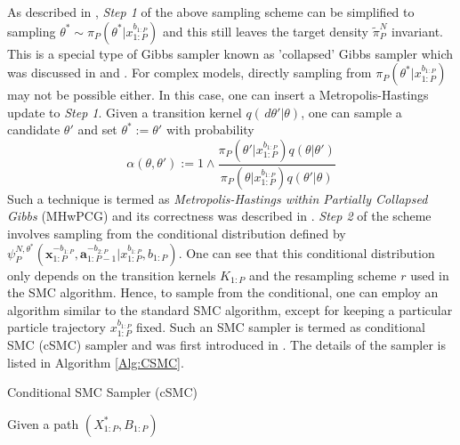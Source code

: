 \documentclass[12pt,a4paper]{article}
\begin{document}
As described in \cite{andrieu2010particle}, \textit{Step 1} of the above sampling scheme can be simplified to sampling $\theta^{*} \sim \pi_P(\theta^{*}|x_{1:P}^{b_{1:P}})$ and this still leaves the target density $\tilde{\pi}_P^N$ invariant. This is a special type of Gibbs sampler known as 'collapsed' Gibbs sampler which was discussed in \cite{liu2001monte} and \cite{van2008partially}. For complex models, directly sampling from \(\pi_P(\theta^{*}|x_{1:P}^{b_{1:P}})\) may not be possible either. In this case, one can insert a Metropolis-Hastings update to \textit{Step 1}. Given a transition kernel \(q(\,d\theta'|\theta)\), one can sample a candidate \(\theta'\) and set \(\theta^{*} := \theta'\) with probability 
\[
    \alpha(\theta,\theta') := 1 \wedge  \frac{\pi_P(\theta'|x_{1:P}^{b_{1:P}})q(\theta|\theta')}{\pi_P(\theta|x_{1:P}^{b_{1:P}})q(\theta'|\theta)} 
\]
Such a technique is termed as \textit{Metropolis-Hastings within Partially Collapsed Gibbs} (MHwPCG) and its correctness was described in \cite{van2008partially}. \textit{Step 2} of the scheme involves sampling from the conditional distribution defined by \(\psi_{P}^{N,\theta^{*}}\left(\mathbf{x}_{1:P}^{-b_{1:P}},\mathbf{a}_{1:P-1}^{-b_{2:P}}|x_{1:P}^{b_{1:P}},b_{1:P}\right)\). One can see that this conditional distribution only depends on the transition kernels $K_{1:P}$ and the resampling scheme $r$ used in the SMC algorithm. Hence, to sample from the conditional, one can employ an algorithm similar to the standard SMC algorithm, except for keeping a particular particle trajectory \(x_{1:P}^{b_{1:P}}\) fixed. Such an SMC sampler is termed as conditional SMC (cSMC) sampler and was first introduced in \cite{andrieu2010particle}. The details of the sampler is listed in Algorithm \ref{Alg:CSMC}.

\begin{algorithm}[htb!]
    \caption{Conditional SMC Sampler (cSMC)}\label{Alg:CSMC}
    Given a path $\left(X_{1:P}^{*},B_{1:P}\right)$\;
    
\end{algorithm}
\end{document}
